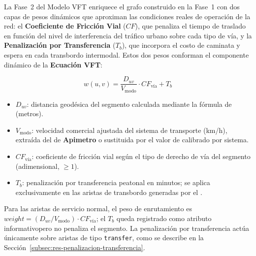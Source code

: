 
La Fase~2 del Modelo VFT enriquece el grafo construido en la Fase~1 con dos
capas de pesos dinámicos que aproximan las condiciones reales de operación de la
red: el \textbf{Coeficiente de Fricción Vial} ($CF$), que penaliza el tiempo de
traslado en función del nivel de interferencia del tráfico urbano sobre cada
tipo de vía, y la \textbf{Penalización por Transferencia} ($T_b$), que incorpora
el costo de caminata y espera en cada transbordo intermodal. Estos dos pesos
conforman el componente dinámico de la \textbf{Ecuación VFT}:

\begin{equation}
    w(u,v) = \frac{D_{uv}}{V_{\text{modo}}} \cdot CF_{\text{vía}} + T_b
    \label{eq:vft-arista}
\end{equation}

\begin{itemize}
    \item $D_{uv}$: distancia geodésica del segmento calculada mediante la
    fórmula de  (metros).
    \item $V_{\text{modo}}$: velocidad comercial ajustada del sistema de
    transporte (km/h), extraída del \geojson{} de \textbf{Apimetro} o
    sustituida por el valor de  calibrado por sistema.
    \item $CF_{\text{vía}}$: coeficiente de fricción vial según el tipo de
    derecho de vía del segmento (adimensional, $\geq 1$).
    \item $T_b$: penalización por transferencia peatonal en minutos; se aplica
    exclusivamente en las aristas de transbordo generadas por el
    .
\end{itemize}

Para las aristas de servicio normal, el peso de enrutamiento es
$\mathit{weight} = (D_{uv}/V_{\text{modo}}) \cdot CF_{\text{vía}}$; el
$T_b$ queda registrado como atributo informativo\DIFaddbegin \DIFadd{, }\DIFaddend pero no penaliza el
segmento. La penalización por transferencia actúa únicamente sobre aristas de
tipo \texttt{transfer}, como se describe en la Sección~\ref{subsec:res-penalizacion-transferencia}.

